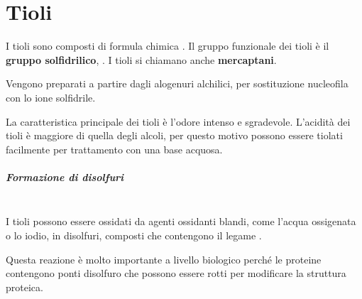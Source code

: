 \chapter{Tioli}
I tioli sono composti di formula chimica . Il gruppo funzionale dei tioli è il \textbf{gruppo solfidrilico}, . I tioli si chiamano anche \textbf{mercaptani}.

Vengono preparati a partire dagli alogenuri alchilici, per sostituzione nucleofila con lo ione solfidrile.

\begin{reaction}
	 \+  \arrow {} \+ 
\end{reaction}

La caratteristica principale dei tioli è l'odore intenso e sgradevole. L'acidità dei tioli è maggiore di quella degli alcoli, per questo motivo possono essere tiolati facilmente per trattamento con una base acquosa.

\begin{reaction}
\end{reaction}

\paragraph{Formazione di disolfuri}\label{par:disolfuri}\mbox{}\\
I tioli possono essere ossidati da agenti ossidanti blandi, come l'acqua ossigenata o lo iodio, in disolfuri, composti che contengono il legame .

\begin{reaction}
\end{reaction}

Questa reazione è molto importante a livello biologico perché le proteine contengono ponti disolfuro che possono essere rotti per modificare la struttura proteica.